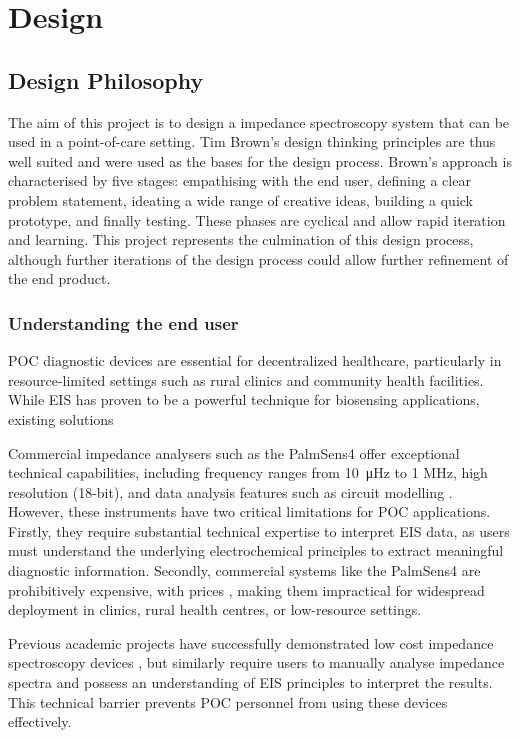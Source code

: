 \graphicspath{{design/fig/}}

\chapter{Design}
\section{Design Philosophy}
The aim of this project is to design a impedance spectroscopy system that can be used in a point-of-care setting. Tim Brown's design thinking principles\cite{brownDesignThinking2008} are thus well suited and were used as the bases for the design process. Brown’s approach is characterised by five stages: empathising with the end user, defining a clear problem statement, ideating a wide range of creative ideas, building a quick prototype, and finally testing. These phases are cyclical and allow rapid iteration and learning. This project represents the culmination of this design process, although further iterations of the design process could allow further refinement of the end product.

\subsection{Understanding the end user}
\Ac{POC} diagnostic devices are essential for decentralized healthcare, particularly in resource-limited settings such as rural clinics and community health facilities. While EIS has proven to be a powerful technique for biosensing applications, existing solutions 

Commercial impedance analysers such as the PalmSens4 offer exceptional technical capabilities, including frequency ranges from \SI{10}{\micro\hertz} to 1 MHz, high resolution (18-bit), and data analysis features such as circuit modelling \cite{PalmSens4}. However, these instruments have two critical limitations for \ac{POC} applications. Firstly, they require substantial technical expertise to interpret EIS data, as users must understand the underlying electrochemical principles to extract meaningful diagnostic information. Secondly, commercial systems like the PalmSens4 are prohibitively expensive, with prices , making them impractical for widespread deployment in clinics, rural health centres, or low-resource settings.

Previous academic projects have successfully demonstrated low cost impedance spectroscopy devices \cite{ebrahimDevelopmentBiosensorEarly2023}\cite{al-aliDesignPortableLowCost2017}\cite{buscagliaSimpleZLowCostPortable2023}, but similarly require users to manually analyse impedance spectra and possess an understanding of EIS principles to interpret the results. This technical barrier prevents POC personnel from using these devices effectively.

